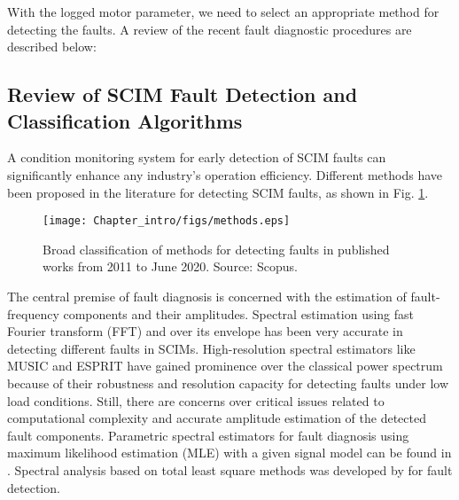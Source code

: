 With the logged motor parameter, we need to select an appropriate method for detecting the faults. A review of the recent fault diagnostic procedures are described below:  

\subsection{Review of SCIM Fault Detection and Classification Algorithms}
A condition monitoring system for early detection of SCIM faults can significantly enhance any industry's operation efficiency. Different methods have been proposed in the literature for detecting SCIM faults, as shown in Fig. \ref{Fig:methods}.
\begin{figure}[h] \centering
	{\texttt{[image: Chapter\_intro/figs/methods.eps]}} \caption{Broad classification of methods for detecting faults in published works from 2011 to June 2020. Source: Scopus.} 
	\label{Fig:methods}
\end{figure}

The central premise of fault diagnosis is concerned with the estimation of fault-frequency components and their amplitudes. Spectral estimation using fast Fourier transform (FFT) \cite{xie2019electromagnetic} and over its envelope \cite{rahman2017online} has been very accurate in detecting different faults in SCIMs. High-resolution spectral estimators like MUSIC \cite{Naha2016, Garcia-Perez2011} and ESPRIT \cite{Kim2013, Xu2012a} have gained prominence over the classical power spectrum because of their robustness and resolution capacity for detecting faults under low load conditions. Still, there are concerns over critical issues related to computational complexity and accurate amplitude estimation of the detected fault components. Parametric spectral estimators for fault diagnosis using maximum likelihood estimation (MLE) with a given signal model can be found in \cite{choqueuse2015induction}. Spectral analysis based on total least square methods was developed by \cite{bouleux2013oblique} for fault detection.

